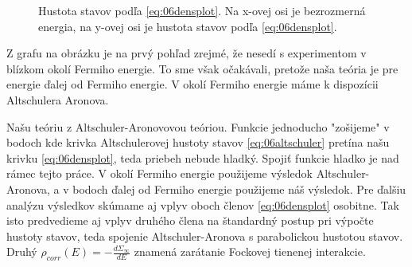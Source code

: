 \begin{figure}[H]
\centering
\caption{Hustota stavov podľa \eqref{eq:06densplot}. Na x-ovej osi je bezrozmerná energia, na y-ovej osi je hustota stavov podľa \eqref{eq:06densplot}.}
\end{figure}
Z grafu na obrázku je na prvý pohľad zrejmé, že nesedí s experimentom v blízkom okolí Fermiho energie. To sme však očakávali, pretože naša teória je pre energie ďalej od Fermiho energie. V okolí Fermiho energie máme k dispozícii Altschulera Aronova. 

 Našu teóriu z Altschuler-Aronovovou teóriou. Funkcie jednoducho "zošijeme" v bodoch kde krivka Altschulerovej hustoty stavov \eqref{eq:06altschuler} pretína našu krivku \eqref{eq:06densplot}, teda priebeh nebude hladký. Spojiť funkcie hladko je nad rámec tejto práce. V okolí Fermiho energie použijeme výsledok Altschuler-Aronova, a v bodoch ďalej od Fermiho energie použijeme náš výsledok. Pre ďalšiu analýzu výsledkov skúmame aj vplyv oboch členov \eqref{eq:06densplot} osobitne. Tak isto predvedieme aj vplyv druhého člena na štandardný postup pri výpočte hustoty stavov, teda spojenie Altschuler-Aronova s parabolickou hustotou stavov. Druhý $\rho_{corr}(E)=-\frac{d\Sigma_{\infty}}{dE}$  znamená zarátanie Fockovej tienenej interakcie.
